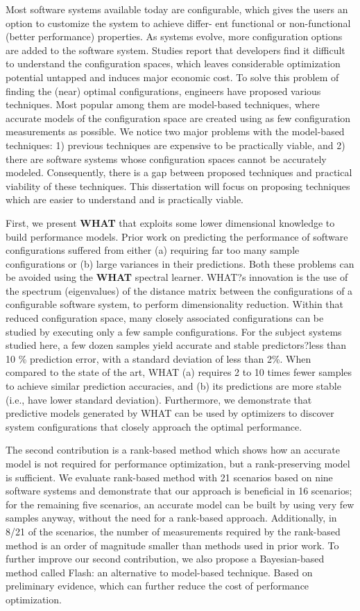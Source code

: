 Most software systems available today are configurable, which gives the users an option to customize the system to achieve differ-
ent functional or non-functional (better performance) properties. As systems evolve, more configuration options are added to the
software system. Studies report that developers find it difficult to
understand the configuration spaces, which leaves considerable
optimization potential untapped and induces major economic cost.
To solve this problem of finding the (near) optimal configurations,
engineers have proposed various techniques. Most popular among
them are model-based techniques, where accurate models of the configuration space are created using as few configuration measurements as possible. We notice two major problems with the model-based techniques: 1) previous techniques are expensive to be practically viable, and 2) there are software systems whose configuration spaces cannot be accurately modeled. Consequently, there is
a gap between proposed techniques and practical viability of these
techniques.
This dissertation will focus on proposing techniques which are
easier to understand and is practically viable. 

First, we present \textbf{WHAT} that exploits
some lower dimensional knowledge to build performance models. Prior work on
predicting the performance of software configurations suffered from either (a) requiring
far too many sample configurations or (b) large variances in their predictions.
Both these problems can be avoided using the \textbf{WHAT} spectral learner. WHAT?s innovation
is the use of the spectrum (eigenvalues) of the distance matrix between the
configurations of a configurable software system, to perform dimensionality reduction.
Within that reduced configuration space, many closely associated configurations
can be studied by executing only a few sample configurations. For the subject systems
studied here, a few dozen samples yield accurate and stable predictors?less than
10 \% prediction error, with a standard deviation of less than 2\%. When compared
to the state of the art, WHAT (a) requires 2 to 10 times fewer samples to achieve
similar prediction accuracies, and (b) its predictions are more stable (i.e., have lower
standard deviation). Furthermore, we demonstrate that predictive models generated
by WHAT can be used by optimizers to discover system configurations that closely
approach the optimal performance.


The second contribution is a rank-based method
which shows how an accurate model is not required for performance optimization, but a rank-preserving model is sufficient. We evaluate rank-based method with 21 scenarios based on nine software systems and demonstrate that our approach is beneficial in 16 scenarios; for the remaining five scenarios, an accurate model
can be built by using very few samples anyway, without the need
for a rank-based approach. Additionally, in 8/21 of the scenarios,
the number of measurements required by the rank-based method
is an order of magnitude smaller than methods used in prior work.
To further improve our second contribution, we also propose a
Bayesian-based method called Flash: an alternative to model-based
technique. Based on preliminary evidence, which can further reduce
the cost of performance optimization. 



